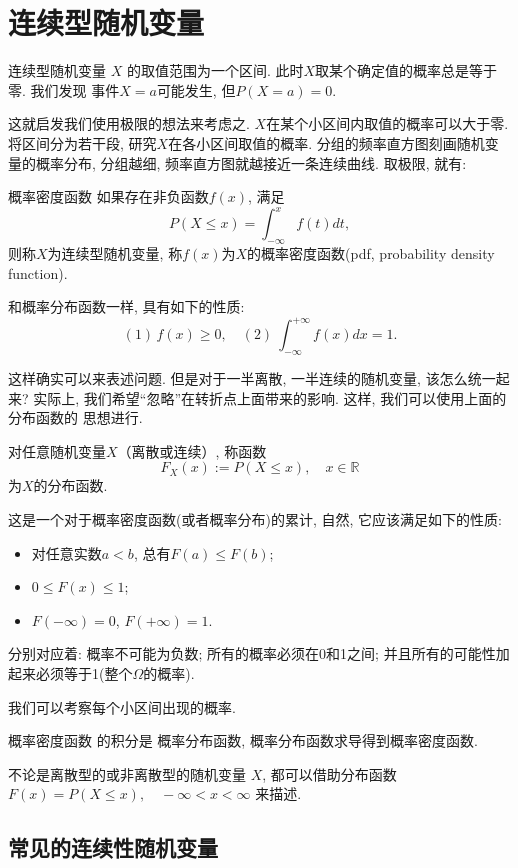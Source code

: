 \section{连续型随机变量}
连续型随机变量 $X$ 的取值范围为一个区间. 此时$X$取某个确定值的概率总是等于零. 我们发现
事件$X=a$可能发生, 但$P(X=a)=0$. 

这就启发我们使用极限的想法来考虑之. $X$在某个小区间内取值的概率可以大于零. 
将区间分为若干段, 研究$X$在各小区间取值的概率. 分组的频率直方图刻画随机变量的概率分布,
分组越细, 频率直方图就越接近一条连续曲线. 取极限, 就有:

\begin{definition}{概率密度函数}
    如果存在非负函数$f(x)$, 满足
    $$
        P(X\leq x)=\int_{-\infty}^{x}f(t)dt,
    $$
    则称$X$为连续型随机变量, 称$f(x)$为$X$的概率密度函数(pdf, probability density function).
\end{definition}

和概率分布函数一样, 具有如下的性质:
$$
    (1)\,f(x)\ge 0,\quad (2)\ \int_{-\infty}^{+\infty}f(x)dx=1.
$$

这样确实可以来表述问题. 但是对于一半离散, 一半连续的随机变量, 该怎么统一起来?
实际上, 我们希望``忽略''在转折点上面带来的影响. 这样, 我们可以使用上面的分布函数的
思想进行.

\begin{definition}
    对任意随机变量$X$（离散或连续）, 称函数
    $$F_X(x):=P(X\le x),\quad x\in \mathbb{R}$$
    为$X$的分布函数. 
\end{definition}
这是一个对于概率密度函数(或者概率分布)的累计, 自然, 它应该满足如下的性质:

\begin{itemize}
    \item 对任意实数$a<b$, 总有$F(a)\le F(b)$;
    \item $0 \le F(x) \le 1$; 
    \item $F(-\infty)=0$, $F(+\infty)=1$. 
\end{itemize}
分别对应着: 概率不可能为负数; 所有的概率必须在0和1之间; 并且所有的可能性加起来必须等于1(整个$\Omega$的概率).
\begin{takeaway}
    我们可以考察每个小区间出现的概率.

    概率密度函数 的积分是 概率分布函数, 概率分布函数求导得到概率密度函数.

    不论是离散型的或非离散型的随机变量 $X$, 都可以借助分布函数$F(x)=P(X \leq x), \quad-\infty<x<\infty$
    来描述.
\end{takeaway}
\subsection{常见的连续性随机变量}

